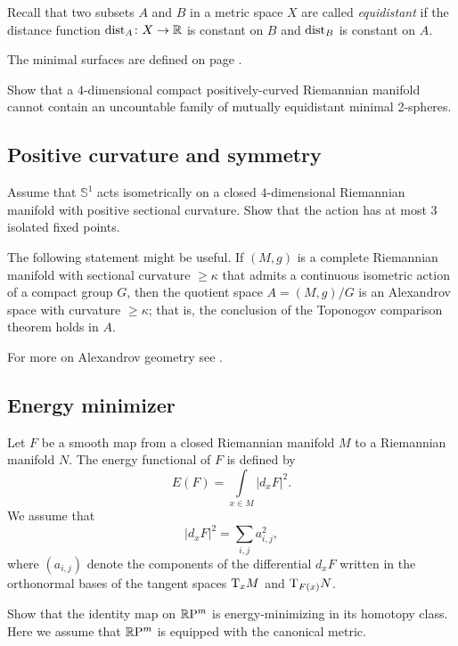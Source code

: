 Recall that two subsets $A$ and $B$ in a metric space $X$ are called \emph{equidistant} if the distance function $\operatorname{\rm dist}\nolimits_A\colon X\to\mathbb{R}$ is constant on $B$ and $\operatorname{\rm dist}\nolimits_B$ is constant on $A$.

The minimal surfaces are defined on page \pageref{minimal surface}.

\begin{pr}
Show that a 
$4$-dimensional
compact
positively-curved
Riemannian manifold
cannot contain an uncountable family of mutually
equidistant minimal 2-spheres.
\end{pr}


\subsection*{Positive curvature and symmetry\thm}
\label{kleiner-hopf} 

\begin{pr}
Assume that $\mathbb S^1$ acts isometrically on a closed $4$-dimensional Riemannian manifold with positive sectional curvature.
Show that the action 
has at most $3$ isolated fixed points.
\end{pr}

The following statement might be useful.
If $(M,g)$ is a complete Riemannian manifold with sectional curvature $\ge \kappa$ that admits a continuous isometric action of a compact group $G$,
then the quotient space $A=(M,g)/G$ is an Alexandrov space with curvature $\ge \kappa$;
that is, the conclusion of the Toponogov comparison theorem holds in $A$. 

For more on Alexandrov geometry see \cite{akp}.

\subsection*{Energy minimizer}
\label{Energy minimizer}

Let $F$ be a smooth map from a closed Riemannian manifold $M$ to a Riemannian manifold $N$.
The energy functional of $F$ is defined by
\[E(F)=\int\limits_{x\in M} |d_xF|^2.\]
We assume that  
\[|d_xF|^2=\sum_{i,j}a_{i,j}^2,\]
where $(a_{i,j})$ denote the components 
of the differential $d_xF$ 
written in the orthonormal bases of the tangent spaces $\mathrm{T}_xM$ and $\mathrm{T}_{F(x)}N$.

\begin{pr}
Show that the identity map on $\mathbb{R}\mathrm{P}^m$ is 
energy-minimizing in its homotopy class.
Here we assume that $\mathbb{R}\mathrm{P}^m$ is equipped with the canonical metric.
\end{pr}


